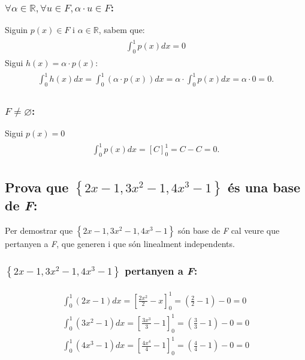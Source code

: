 \documentclass[a4paper, 11pt]{article}
\begin{document}
            \subsubsection{${\forall\alpha\in\mathbb{R}, \forall u \in F, \alpha\cdot u \in F}$:}
            Siguin ${p(x) \in F \text{ i } \alpha\in\mathbb{R}}$, sabem que:
            \begin{align*}
                \begin{aligned}
                    \int_0^1p(x)dx = 0
                \end{aligned}
            \end{align*}
            Sigui ${h(x) = \alpha\cdot p(x)}$:
            \begin{align*}
                \begin{aligned}
                    \int_0^1h(x)dx = \int_0^1\left(\alpha\cdot p(x)\right)dx = \alpha \cdot \int_0^1p(x)dx = \alpha \cdot 0 = 0.
                \end{aligned}
            \end{align*}

            \subsubsection{${F \neq \varnothing}$:}
            Sigui ${p(x) = 0}$
            \begin{align*}
                \begin{aligned}
                    \int_0^1p(x)dx = \left[C\right]_0^1 = C - C = 0.
                \end{aligned}
            \end{align*}

        \subsection{Prova que ${\left\{2x-1, 3x^2-1, 4x^3-1\right\}}$ \'es una base de \emph{F}:}
            Per demostrar que ${\left\{2x-1, 3x^2-1, 4x^3-1\right\}}$ s\'on base de \emph{F} cal veure que pertanyen a \emph{F}, que generen i que s\'on linealment independents.
            
            \subsubsection{${\left\{2x-1, 3x^2-1, 4x^3-1\right\}}$ pertanyen a \emph{F}:}
            \begin{align*}
                \begin{aligned}
                    \int_0^1\left(2x-1\right)dx = \left[\frac{2x^2}{2}-x\right]_0^1 = \left(\frac{2}{2}-1\right) - 0 = 0\\
                    \int_0^1\left(3x^2-1\right)dx = \left[\frac{3x^3}{3}-1\right]_0^1 = \left(\frac{3}{3}-1\right) - 0 = 0\\
                    \int_0^1\left(4x^3-1\right)dx = \left[\frac{4x^4}{4}-1\right]_0^1 = \left(\frac{4}{4}-1\right) - 0 = 0
                \end{aligned}
            \end{align*}
\end{document}
